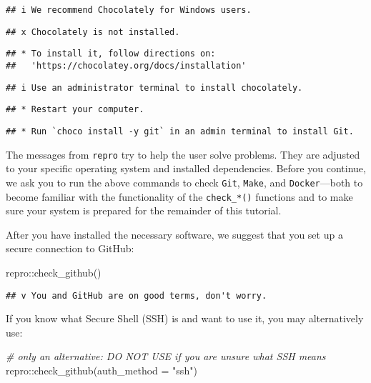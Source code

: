 \documentclass[psych,tutorial,submit,moreauthors,pdftex]{mdpi}
\newenvironment{Shaded}{\begin{snugshade}}{\end{snugshade}}
\newcommand{\AttributeTok}[1]{\textcolor[rgb]{0.77,0.63,0.00}{#1}}
\newcommand{\CommentTok}[1]{\textcolor[rgb]{0.56,0.35,0.01}{\textit{#1}}}
\newcommand{\FunctionTok}[1]{\textcolor[rgb]{0.00,0.00,0.00}{#1}}
\newcommand{\NormalTok}[1]{#1}
\newcommand{\SpecialCharTok}[1]{\textcolor[rgb]{0.00,0.00,0.00}{#1}}
\newcommand{\StringTok}[1]{\textcolor[rgb]{0.31,0.60,0.02}{#1}}
\begin{document}
\begin{verbatim}
## i We recommend Chocolately for Windows users.
\end{verbatim}

\begin{verbatim}
## x Chocolately is not installed.
\end{verbatim}

\begin{verbatim}
## * To install it, follow directions on: 
##   'https://chocolatey.org/docs/installation'
\end{verbatim}

\begin{verbatim}
## i Use an administrator terminal to install chocolately.
\end{verbatim}

\begin{verbatim}
## * Restart your computer.
\end{verbatim}

\begin{verbatim}
## * Run `choco install -y git` in an admin terminal to install Git.
\end{verbatim}

The messages from \texttt{repro} try to help the user solve problems.
They are adjusted to your specific operating system and installed
dependencies. Before you continue, we ask you to run the above commands
to check \texttt{Git}, \texttt{Make}, and \texttt{Docker}---both to
become familiar with the functionality of the \texttt{check\_*()}
functions and to make sure your system is prepared for the remainder of
this tutorial.

After you have installed the necessary software, we suggest that you set
up a secure connection to GitHub:

\begin{Shaded}
\begin{Highlighting}[]
\NormalTok{repro}\SpecialCharTok{::}\FunctionTok{check\_github}\NormalTok{()}
\end{Highlighting}
\end{Shaded}

\begin{verbatim}
## v You and GitHub are on good terms, don't worry.
\end{verbatim}

If you know what Secure Shell (SSH) is and want to use it, you may
alternatively use:

\begin{Shaded}
\begin{Highlighting}[]
\CommentTok{\# only an alternative: DO NOT USE if you are unsure what SSH means}
\NormalTok{repro}\SpecialCharTok{::}\FunctionTok{check\_github}\NormalTok{(}\AttributeTok{auth\_method =} \StringTok{"ssh"}\NormalTok{)}
\end{Highlighting}
\end{Shaded}
\end{document}
